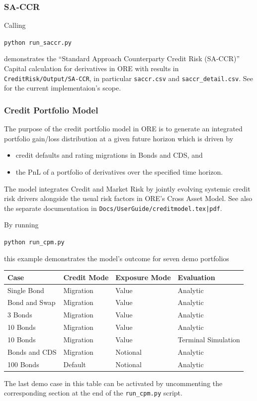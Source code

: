 \subsubsection{SA-CCR}\label{example:creditrisk_saccr}

Calling
\medskip
\centerline {\tt python run\_saccr.py} 

\medskip
demonstrates the ``Standard Approach Counterparty Credit Risk (SA-CCR)'' Capital calculation for
derivatives in ORE with results in {\tt CreditRisk/Output/SA-CCR}, in particular {\tt saccr.csv}
and {\tt saccr\_detail.csv}. See \cite{methods} for the current implementaion's scope. 

\subsubsection{Credit Portfolio Model}\label{example:creditrisk_cpm}

The purpose of the credit portfolio model in ORE is to generate an integrated portfolio gain/loss distribution
at a given future horizon which is driven by 
\begin{itemize}
\item credit defaults and rating migrations in Bonds and CDS, and 
\item the PnL of a portfolio of derivatives over the specified time horizon.
\end{itemize}
The model integrates Credit and Market Risk by jointly evolving systemic credit risk drivers
alongside the usual risk factors in ORE's Cross Asset Model.
See also the separate documentation in {\tt Docs/UserGuide/creditmodel.tex|pdf}.

By running \\
\medskip
\centerline{{\tt python run\_cpm.py}} 

\medskip
this example demonstrates the model's outcome for seven demo portfolios

\begin{center}
\begin{tabular}{|l|l|l|l|}
\hline
Case & Credit Mode & Exposure Mode & Evaluation \\
\hline
\hline
Single Bond & Migration & Value & Analytic \\
\hline
Bond and Swap & Migration & Value & Analytic \\
\hline
3 Bonds & Migration & Value & Analytic \\
\hline
10 Bonds & Migration & Value & Analytic \\
\hline
10 Bonds & Migration & Value & Terminal Simulation \\
\hline
Bonds and CDS & Migration & Notional & Analytic \\
\hline
100 Bonds & Default & Notional & Analytic \\
\hline
\end{tabular}
\end{center}
The last demo case in this table can be activated by uncommenting the corresponding section at the end of the {\tt run\_cpm.py}
script.

